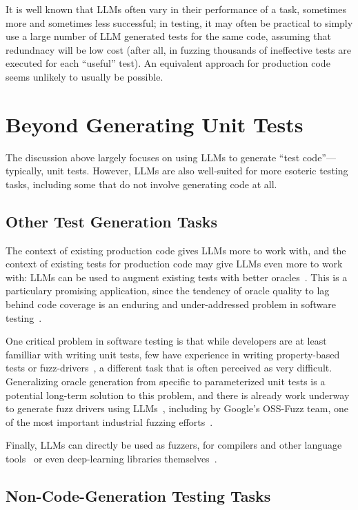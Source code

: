 \documentclass[sigconf,natbib=false]{acmart}
\begin{document}
It is well known that LLMs often vary in their performance of a task,
sometimes more and sometimes less successful; in testing, it may often
be practical to simply use a large number of LLM generated tests for
the same code, assuming that redundnacy will be low cost (after all,
in fuzzing thousands of ineffective tests are executed for each
``useful'' test).  An equivalent approach for production code seems
unlikely to usually be possible.


\section{Beyond Generating Unit Tests}

The discussion above largely focuses on using LLMs to generate ``test
code''---typically, unit tests.  However, LLMs are also well-suited
for more esoteric testing tasks, including some that do not involve
generating code at all.

\subsection{Other Test Generation Tasks}

The context of existing production code gives LLMs more to work with,
and the context of existing tests for production code may give LLMs
even more to work with: LLMs can be used to augment existing tests
with better oracles~\cite{OracleGEN}.  This is a particulary promising
application, since the tendency of oracle quality to lag behind code coverage
is an enduring and under-addressed problem in software testing~\cite{MindGap}.

One critical problem in software testing is that while developers are
at least familliar with writing unit tests, few have experience in
writing property-based tests or fuzz-drivers~\cite{goldstein2022some}, a different task
that is often perceived as very difficult.  Generalizing oracle
generation from specific to parameterized unit tests is a potential
long-term solution to this problem, and there is already work underway
to generate fuzz drivers using LLMs~\cite{zhang2023understanding},
including by Google's OSS-Fuzz team, one of the most important
industrial fuzzing efforts~\cite{ossfuzzllm}.

Finally, LLMs can directly be used as fuzzers, for compilers and other
language tools~\cite{xia2023universal} or even
deep-learning libraries themselves~\cite{LLMFuzz}.

\subsection{Non-Code-Generation Testing Tasks}
\end{document}

